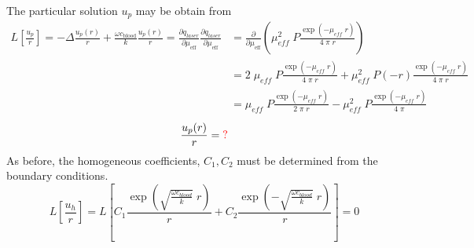 \documentclass{article}         %
\theoremstyle{definition}
\theoremstyle{remark}
\begin{document}
The particular solution $u_p$ may be obtain from 
\[
\begin{split}
  L \left[\frac{u_p}{r} \right] = 
 -\Delta  \frac{u_p(r)}{r} 
 + \frac{\omega c_\text{blood}}{k}  \frac{u_p(r)}{r} 
 = 
    \frac{\partial q_{laser}}{\partial \mu_\text{eff}}
   \frac{\partial q_{laser}}{\partial \mu_\text{eff}}
 &  = 
   \frac{\partial }{\partial \mu_\text{eff}}
   \left(
    \mu_\textit{eff}^2 \;  P
    \frac{ \exp \left(-\mu_\textit{eff} \; r \right) }{ 4 \; \pi \; r}
   \right)
\\
 & = 
   2 \; \mu_\textit{eff} \;  P
    \frac{ \exp \left(-\mu_\textit{eff} \; r \right) }{ 4 \; \pi \; r}
   + 
    \mu_\textit{eff}^2 \;  P
    \left(-r\right) \frac{ \exp \left(-\mu_\textit{eff} \; r \right) }{ 4 \; \pi \; r}
 \\
 & = 
    \mu_\textit{eff} \;  P
    \frac{ \exp \left(-\mu_\textit{eff} \; r \right) }{ 2 \; \pi \; r}
   - 
    \mu_\textit{eff}^2 \;  P
                    \frac{ \exp \left(-\mu_\textit{eff} \; r \right) }{ 4 \; \pi }
 \end{split}
\]
\[
  \frac{u_p(r)}{r}  =  
\text{\color{red} ?}
\]
As before, the homogeneous coefficients, $C_1, C_2$ must be determined from the 
boundary conditions.
\[
  L \left[\frac{u_h}{r} \right] =   
 L\left[
    C_1 \frac{\exp\left( \sqrt{\frac{\omega c_\textit{blood}}{k}} \; r \right)}{r}  
  + 
    C_2 \frac{\exp\left(-\sqrt{\frac{\omega c_\textit{blood}}{k}} \; r \right)}{r}  
\right]
  = 0
\]
\end{document}
